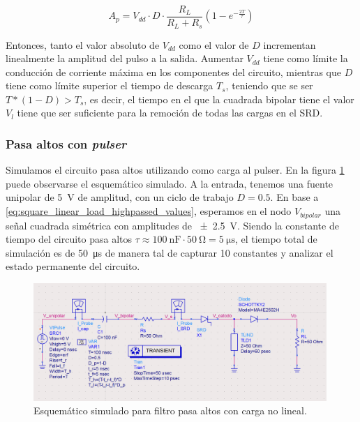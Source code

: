 \begin{equation}
    A_p = V_{dd} \cdot D \cdot \frac{R_L}{R_L+R_s} \left( 1-e^{-\frac{2T}{\tau}}\right)
\end{equation}

Entonces, tanto el valor absoluto de $V_{dd}$ como el valor de $D$ incrementan
linealmente la amplitud del pulso a la salida. Aumentar $V_{dd}$ tiene como
límite la conducción de corriente máxima en los componentes del circuito,
mientras que $D$ tiene como límite superior el tiempo de descarga $T_s$,
teniendo que se ser $T*(1-D) > T_s$, es decir, el tiempo en el que la cuadrada
bipolar tiene el valor $V_l$ tiene que ser suficiente para la remoción de todas
las cargas en el SRD.

\subsubsection{Pasa altos con \textit{pulser}}
\label{sec:carga_no_lineal}

Simulamos el circuito pasa altos utilizando como carga al pulser. En la figura
\ref{fig:highpass_filter_nonlinear_load_sch} puede observarse el esquemático
simulado. A la entrada, tenemos una fuente unipolar de \qty{5}{\volt} de
amplitud, con un ciclo de trabajo $D=0.5$. En base a
\ref{eq:square_linear_load_highpassed_values}, esperamos en el nodo
$V_{bipolar}$ una señal cuadrada simétrica con amplitudes de
\qty{\pm2.5}{\volt}. Siendo la constante de tiempo del circuito pasa altos $\tau
\approx \qty{100}{\nano\farad} \cdot \qty{50}{\ohm} = \qty{5}{\micro\second}$,
el tiempo total de simulación es de \qty{50}{\micro\second} de manera tal de
capturar 10 constantes y analizar el estado permanente del circuito.

\begin{figure}[tbp]
    \centering
    \includegraphics[width=0.99\textwidth]{images/highpass_filter_nonlinear_load_sch.png}
    \caption{Esquemático simulado para filtro pasa altos con carga no lineal.}
    \label{fig:highpass_filter_nonlinear_load_sch}
\end{figure}


